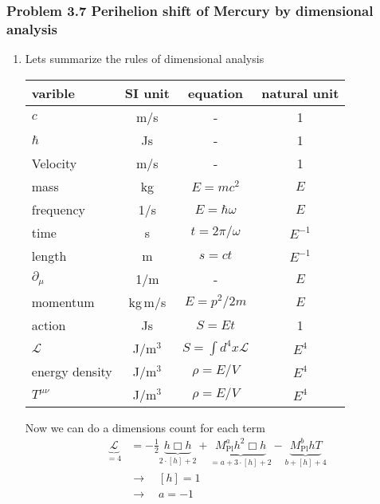 \documentclass[10pt,a4paper]{article}
\theoremstyle{definition}
\begin{document}
\subsubsection{Problem 3.7 Perihelion shift of Mercury by dimensional analysis}
\begin{enumerate}[label=(\alph*)]
\item Lets summarize the rules of dimensional analysis 

\begin{center}
\begin{tabular}{ lccc } 
 \hline
 varible & SI unit &equation & natural unit \\ 
 \hline\hline
 $c$               & m/s    & -                        & 1        \\
 $\hbar$           & Js     & -                        & 1        \\
 Velocity          & m/s    & -                        & 1      \\
 mass              & kg     & $E=mc^2$                 & $E$      \\
 frequency         & 1/s    & $E=\hbar\omega$          & $E$      \\
 time              & s      & $t=2\pi/\omega$          & $E^{-1}$ \\
 length            & m      & $s=ct$                   & $E^{-1}$ \\
 $\partial_\mu$    & 1/m    & -                        & $E$      \\
 momentum          & kg\,m/s& $E=p^2/2m$               & $E$      \\
 action            & Js     & $S=Et$                   & 1        \\
 $\mathcal{L}$     & J/m$^3$& $S=\int d^4x\mathcal{L}$ & $E^4$    \\
 energy density    & J/m$^3$& $\rho=E/V$               & $E^4$    \\
 $T^{\mu\nu}$      & J/m$^3$& $\rho=E/V$               & $E^4$    \\
 \hline
\end{tabular}
\end{center}
Now we can do a dimensions count for each term
\begin{align}
\underbrace{\mathcal{L}}_{=4}&=-\frac{1}{2}\underbrace{h\Box h}_{2\cdot[h]+2}+ \underbrace{M_\text{Pl}^a h^2\Box h}_{=a+3\cdot[h]+2}-\underbrace{M_\text{Pl}^bhT}_{b+[h]+4}\\
&\rightarrow\quad[h]=1\\
&\rightarrow\quad a=-1\\

\end{align}
\end{enumerate}
\end{document}
